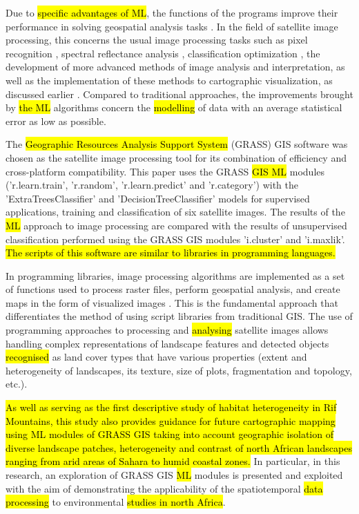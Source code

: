 \documentclass[geomatics,article,submit,pdftex,moreauthors]{Definitions/mdpi}
\begin{document}
Due to \hl{specific advantages of ML}, the functions of the programs improve their performance in solving geospatial analysis tasks \cite{More02072020,Lemenkova202403,GarciaPedrero03042017}. In the field of satellite image processing, this concerns the usual image processing tasks such as pixel recognition \cite{NASIRI2023103555,EBRAHIMY2023103390}, spectral reflectance analysis \cite{FU2024104421}, classification optimization \cite{PADHY2024100278,Lemenkova202401}, the development of more advanced methods of image analysis and interpretation, as well as the implementation of these methods to cartographic visualization, as discussed earlier \cite{HABIB20231,Lemenkova202406,KHALDI2024104191}. Compared to traditional approaches, the improvements brought by \hl{the ML} algorithms concern the \hl{modelling} of data with an average statistical error as low as possible.

The \hl{Geographic Resources Analysis Support System} (GRASS) GIS software was chosen as the satellite image processing tool for its combination of efficiency and cross-platform compatibility. This paper uses the GRASS \hl{GIS ML} modules ('r.learn.train', 'r.random', 'r.learn.predict' and 'r.category') with the 'ExtraTreesClassifier' and 'DecisionTreeClassifier' models for supervised applications, training and classification of six satellite images. The results of the \hl{ML} approach to image processing are compared with the results of unsupervised classification performed using the GRASS GIS modules 'i.cluster' and 'i.maxlik'. \hl{The scripts of this software are similar to libraries in programming languages.}

In programming libraries, image processing algorithms are implemented as a set of functions used to process raster files, perform geospatial analysis, and create maps in the form of visualized images \cite{Lemenkova202227,PEREIRA2023106653,ESKANDARI2024}. This is the fundamental approach that differentiates the method of using script libraries from traditional GIS. The use of programming approaches to processing and \hl{analysing} satellite images allows handling complex representations of landscape features and detected objects \hl{recognised} as land cover types that have various properties (extent and heterogeneity of landscapes, its texture, size of plots, fragmentation and topology, etc.).

\hl{As well as serving as the first descriptive study of habitat heterogeneity in Rif Mountains, this study also provides guidance for future cartographic mapping using ML modules of GRASS GIS taking into account geographic isolation of diverse landscape patches, heterogeneity and contrast of north African landscapes ranging from arid areas of Sahara to humid coastal zones. }In particular, in this research, an exploration of GRASS GIS \hl{ML} modules is presented and exploited with the aim of demonstrating the applicability of the spatiotemporal \hl{data processing} to environmental \hl{studies in north Africa}.
\end{document}
